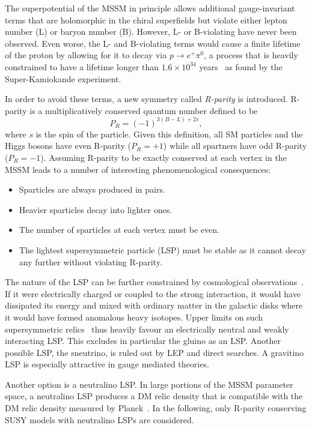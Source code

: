 The superpotential of the MSSM in principle allows additional gauge-invariant terms that are holomorphic in the chiral superfields but violate either lepton number (L) or baryon number (B). However, L- or B-violating have never been observed. Even worse, the L- and B-violating terms would cause a finite lifetime of the proton by allowing for it to decay \eg via $p\rightarrow e^+ \pi^0$, a process that is heavily constrained to have a lifetime longer than $1.6\times 10^{34}$ years~\cite{Miura:2016krn} as found by the Super-Kamiokande experiment.

In order to avoid these terms, a new symmetry called \textit{R-parity} is introduced. R-parity is a multiplicatively conserved quantum number defined to be
\begin{equation}
	P_R = (-1)^{3(B-L)+2s},
	\label{eq:rparity}
\end{equation}
where $s$ is the spin of the particle. Given this definition, all SM particles and the Higgs bosons have even R-parity ($P_R = +1$) while all spartners have odd R-parity ($P_R = -1$). Assuming R-parity to be exactly conserved at each vertex in the MSSM leads to a number of interesting phenomenological consequences:
\begin{itemize}
	\item Sparticles are always produced in pairs.
	\item Heavier sparticles decay into lighter ones.
	\item The number of sparticles at each vertex must be even.
	\item The lightest supersymmetric particle (LSP) must be stable as it cannot decay any further without violating R-parity.	
\end{itemize}
The nature of the LSP can be further constrained by cosmological observations~\cite{Ellis:1998eh}. If it were electrically charged or coupled to the strong interaction, it would have dissipated its energy and mixed with ordinary matter in the galactic disks where it would have formed anomalous heavy isotopes. Upper limits on such supersymmetric relics~\cite{Ellis:1983ew} thus heavily favour an electrically neutral and weakly interacting LSP. This excludes in particular the gluino as an LSP. Another possible LSP, the sneutrino, is ruled out by LEP and direct searches. A gravitino LSP is especially attractive in gauge mediated theories. 

Another option is a neutralino LSP. In large portions of the MSSM parameter space, a neutralino LSP produces a DM relic density that is compatible with the DM relic density measured by Planck~\cite{Ellis:1983ew, Aghanim:2018eyx}. In the following, only R-parity conserving SUSY models with neutralino LSPs are considered.

